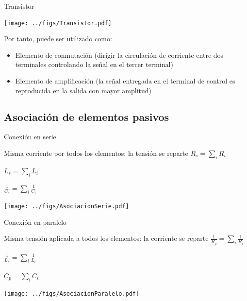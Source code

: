 \documentclass[xcolor={usenames,svgnames,dvipsnames}]{beamer}
\begin{document}
\begin{frame}[label={sec:orgdffc493}]{Transistor}
\begin{center}
\texttt{[image: ../figs/Transistor.pdf]}
\end{center}

Por tanto, puede ser utilizado como:

\begin{itemize}
\item \alert{Elemento de conmutación} (dirigir la circulación de corriente entre
dos terminales controlando la señal en el tercer terminal)

\item \alert{Elemento de amplificación} (la señal entregada en el terminal de
control es reproducida en la salida con mayor amplitud)
\end{itemize}
\end{frame}

\subsection{Asociación de elementos pasivos}
\label{sec:org20ceea8}

\begin{frame}[label={sec:orge749bb5}]{Conexión en serie}
\begin{block}{Misma corriente por todos los elementos: la tensión se reparte}
\(R_{s}=\sum_{i}R_{i}\)

\(L_{s}=\sum_{i}L_{i}\)

\(\frac{1}{C_{s}}=\sum_{i}\frac{1}{C_{i}}\)
\begin{center}
\texttt{[image: ../figs/AsociacionSerie.pdf]}
\end{center}
\end{block}
\end{frame}

\begin{frame}[label={sec:org41bb683}]{Conexión en paralelo}
\begin{block}{Misma tensión aplicada a todos los elementos: la corriente se reparte}
\(\frac{1}{R_{p}}=\sum_{i}\frac{1}{R_{i}}\)

\(\frac{1}{L_{p}}=\sum_{i}\frac{1}{L_{i}}\)

\(C_{p}=\sum_{i}C_{i}\)
\begin{center}
\texttt{[image: ../figs/AsociacionParalelo.pdf]}
\end{center}
\end{block}
\end{frame}
\end{document}
